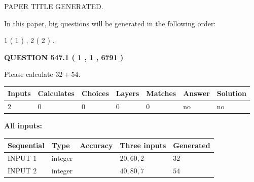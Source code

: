 \documentclass[12pt]{article}
\begin{document}
   
\vspace{0.2in}
   
   
   
   
   
   
   
   
 \vspace{0.2in}
 
 
 
 
   
   
 PAPER TITLE GENERATED.
   
   
   
\vspace{0.2in}
   
In this paper, big questions will be generated in the following order: 
   
   
   1 ( 1 )
 ,
   2 ( 2 )
 .
  
\vspace{0.2in}
  
{\textbf{\Large{QUESTION
547.1 
 ( 1 , 1 , 6791 )
}}}
  
  
 
Please calculate $ %
32 +  %
54 $.
 
 
   
   
   
   
\noindent\begin{tabular}{|l|l|l|l|l|l|l|}
 \hline
Inputs & Calculates & Choices & Layers & Matches & Answer & Solution \\ \hline
 2  & 
 0  & 
 0
  & 
 0  & 
 0  & 
  no & 
  no 
  \\ \hline
 \end{tabular}
   
   
   
   
\noindent{}
   
   
   
   
\noindent\vspace{0.1in}\hspace{-0.08in} {\textbf{\Large{All inputs: }}}
   
   
  
  
\noindent\begin{tabular}{|l|l|l|l|l|}
\hline
 Sequential & Type & Accuracy & Three inputs & Generated \\ 
\hline
 
 
  INPUT $  1 $ & integer &  & $
 20
 , 
 60
 , 
 2
 $ & $ 32 $ 
 \\  \hline  
 
 
  INPUT $  2 $ & integer &  & $
 40
 , 
 80
 , 
 7
 $ & $ 54 $ 
 \\  \hline  
 \end{tabular}
   
\end{document}
